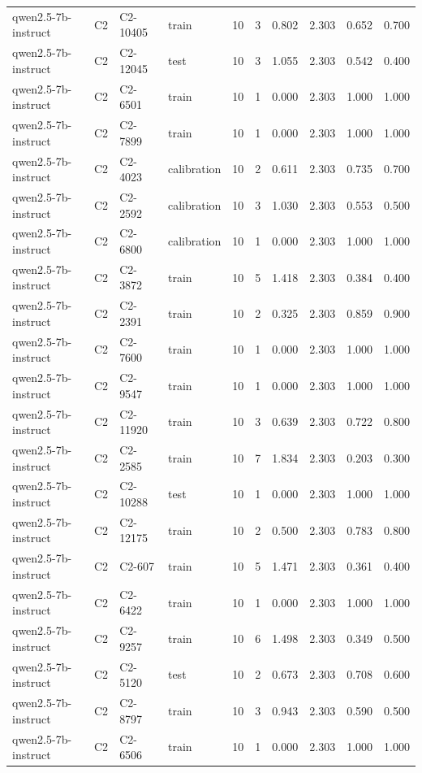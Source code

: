 \begin{table}
\begin{tabular}{llllrrrrrr}
qwen2.5-7b-instruct & C2 & C2-10405 & train & 10 & 3 & 0.802 & 2.303 & 0.652 & 0.700 \\
qwen2.5-7b-instruct & C2 & C2-12045 & test & 10 & 3 & 1.055 & 2.303 & 0.542 & 0.400 \\
qwen2.5-7b-instruct & C2 & C2-6501 & train & 10 & 1 & 0.000 & 2.303 & 1.000 & 1.000 \\
qwen2.5-7b-instruct & C2 & C2-7899 & train & 10 & 1 & 0.000 & 2.303 & 1.000 & 1.000 \\
qwen2.5-7b-instruct & C2 & C2-4023 & calibration & 10 & 2 & 0.611 & 2.303 & 0.735 & 0.700 \\
qwen2.5-7b-instruct & C2 & C2-2592 & calibration & 10 & 3 & 1.030 & 2.303 & 0.553 & 0.500 \\
qwen2.5-7b-instruct & C2 & C2-6800 & calibration & 10 & 1 & 0.000 & 2.303 & 1.000 & 1.000 \\
qwen2.5-7b-instruct & C2 & C2-3872 & train & 10 & 5 & 1.418 & 2.303 & 0.384 & 0.400 \\
qwen2.5-7b-instruct & C2 & C2-2391 & train & 10 & 2 & 0.325 & 2.303 & 0.859 & 0.900 \\
qwen2.5-7b-instruct & C2 & C2-7600 & train & 10 & 1 & 0.000 & 2.303 & 1.000 & 1.000 \\
qwen2.5-7b-instruct & C2 & C2-9547 & train & 10 & 1 & 0.000 & 2.303 & 1.000 & 1.000 \\
qwen2.5-7b-instruct & C2 & C2-11920 & train & 10 & 3 & 0.639 & 2.303 & 0.722 & 0.800 \\
qwen2.5-7b-instruct & C2 & C2-2585 & train & 10 & 7 & 1.834 & 2.303 & 0.203 & 0.300 \\
qwen2.5-7b-instruct & C2 & C2-10288 & test & 10 & 1 & 0.000 & 2.303 & 1.000 & 1.000 \\
qwen2.5-7b-instruct & C2 & C2-12175 & train & 10 & 2 & 0.500 & 2.303 & 0.783 & 0.800 \\
qwen2.5-7b-instruct & C2 & C2-607 & train & 10 & 5 & 1.471 & 2.303 & 0.361 & 0.400 \\
qwen2.5-7b-instruct & C2 & C2-6422 & train & 10 & 1 & 0.000 & 2.303 & 1.000 & 1.000 \\
qwen2.5-7b-instruct & C2 & C2-9257 & train & 10 & 6 & 1.498 & 2.303 & 0.349 & 0.500 \\
qwen2.5-7b-instruct & C2 & C2-5120 & test & 10 & 2 & 0.673 & 2.303 & 0.708 & 0.600 \\
qwen2.5-7b-instruct & C2 & C2-8797 & train & 10 & 3 & 0.943 & 2.303 & 0.590 & 0.500 \\
qwen2.5-7b-instruct & C2 & C2-6506 & train & 10 & 1 & 0.000 & 2.303 & 1.000 & 1.000 \\

\end{tabular}
\end{table}
